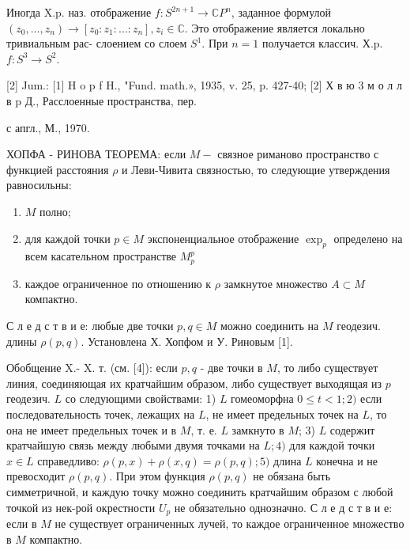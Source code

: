 \documentclass[10pt]{article}
\begin{document}
Иногда X.p. наз. отображение $f: S^{2 n+1} \longrightarrow \mathbb{C} P^{n}$, заданное формулой $\left(z_{0}, \ldots, z_{n}\right) \longrightarrow\left[z_{0}: z_{1}: \ldots: z_{n}\right], z_{i} \in \mathbb{C}$. Это отображение является локально тривиальным рас- слоением со слоем $S^{1}$. При $n=1$ получается классич. Х.p. $f: S^{3} \rightarrow S^{2}$.



[2] Jum.: [1] H o p f H., "Fund. math.», 1935, v. 25, p. 427-40; [2] Х в ю 3 м о л л в $\mathrm{p}$ Д., Расслоенные пространства, пер.

с апгл., М., 1970.



ХОПФА - РИНОВА ТЕОРЕМА: если $M-$ связное риманово пространство с функцией расстояния $\rho$ и Леви-Чивита связностью, то следующие утверждения равносильны:



\begin{enumerate}

  \item $M$ полно;



  \item для каждой точки $p \in M$ экспоненциальное отображение $\exp _{p}$ определено на всем касательном пространстве $M_{p}^{p}$



  \item каждое ограниченное по отношению к $\rho$ замкнутое множество $A \subset M$ компактно.



\end{enumerate}



С л е д с т в и е: любые две точки $p, q \in M$ можно соединить на $M$ геодезич. длины $\rho(p, q)$. Установлена Х. Хопфом и У. Риновым [1].



Обобщение X.- $\mathrm{X}$. т. (см. [4]): если $p, q$ - две точки в $M$, то либо существует линия, соединяющая их кратчайшим образом, либо существует выходящая из $p$ геодезич. $L$ со следующими свойствами: 1) $L$ гомеоморфна $0 \leqslant t<1 ; 2)$ если последовательность точек, лежащих на $L$, не имеет предельных точек на $L$, то она не имеет предельных точек и в $M$, т. е. $L$ замкнуто в $M$; 3) $L$ содержит кратчайшую связь между любыми двумя точками на $L ; 4)$ для каждой точки $x \in L$ справедливо: $\rho(p, x)+\rho(x, q)=\rho(p, q) ; 5)$ длина $L$ конечна и не превосходит $\rho(p, q)$. При этом функция $\rho(p, q)$ не обязана быть симметричной, и каждую точку можно соединить кратчайшим образом с любой точкой из нек-рой окрестности $U_{p}$ не обязательно однозначно. С л е д с т в и е: если в $M$ не существует ограниченных лучей, то каждое ограниченное множество в $M$ компактно.
\end{document}
